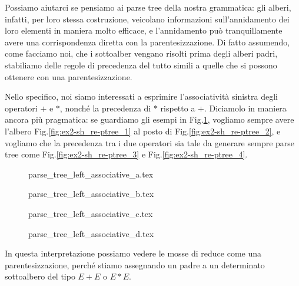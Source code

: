 \documentclass[class=book, crop=false, oneside, 12pt]{standalone}
\begin{document}
Possiamo aiutarci se pensiamo ai parse tree della nostra grammatica: gli alberi, infatti, per loro stessa costruzione, veicolano informazioni sull'annidamento dei loro elementi in maniera molto efficace, e l'annidamento può tranquillamente avere una corrispondenza diretta con la parentesizzazione. Di fatto assumendo, come facciamo noi, che i sottoalber vengano risolti prima degli alberi padri, stabiliamo delle regole di precedenza del tutto simili a quelle che si possono ottenere con una parentesizzazione.

Nello specifico, noi siamo interessati a esprimire l'associatività sinistra degli operatori \(+\) e \(*\), nonché la precedenza di \(*\) rispetto a \(+\). Diciamolo in maniera ancora più pragmatica: se guardiamo gli esempi in Fig.\ref{fig:ex2-sh_re-ptree}, vogliamo sempre avere l'albero Fig.\ref{fig:ex2-sh_re-ptree_1} al posto di Fig.\ref{fig:ex2-sh_re-ptree_2}, e vogliamo che la precedenza tra i due operatori sia tale da generare sempre parse tree come Fig.\ref{fig:ex2-sh_re-ptree_3} e Fig.\ref{fig:ex2-sh_re-ptree_4}.
\begin{figure}[H]
    \begin{minipage}[b]{.4\textwidth}
        \centering
        {parse_tree_left_associative_a.tex}
        \label{fig:ex2-sh_re-ptree_1}
    \end{minipage}
    \hfill
    \begin{minipage}[b]{.4\textwidth}
        \centering
        {parse_tree_left_associative_b.tex}
        \label{fig:ex2-sh_re-ptree_2}
    \end{minipage}
    
    \begin{minipage}[b]{.4\textwidth}
        \centering
        {parse_tree_left_associative_c.tex}
        \label{fig:ex2-sh_re-ptree_3}
    \end{minipage}
    \hfill
    \begin{minipage}[b]{.4\textwidth}
        \centering
        {parse_tree_left_associative_d.tex}
        \label{fig:ex2-sh_re-ptree_4}
    \end{minipage}
    \caption{}
    \label{fig:ex2-sh_re-ptree}
\end{figure}
In questa interpretazione possiamo vedere le mosse di reduce come una parentesizzazione, perché stiamo assegnando un padre a un determinato sottoalbero del tipo \(E + E\) o \(E * E\).
\end{document}
